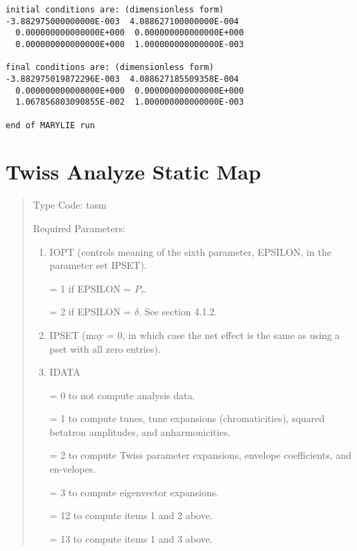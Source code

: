 \begin{footnotesize}
\begin{verbatim}
initial conditions are: (dimensionless form)
-3.882975000000000E-003  4.088627100000000E-004
  0.000000000000000E+000  0.000000000000000E+000
  0.000000000000000E+000  1.000000000000000E-003

final conditions are: (dimensionless form)
-3.882975019872296E-003  4.088627185509358E-004
  0.000000000000000E+000  0.000000000000000E+000
  1.067856803090855E-002  1.000000000000000E-003

end of MARYLIE run
\end{verbatim}
\end{footnotesize}

\newpage
\section{Twiss Analyze Static Map}
\begin{quotation}
\noindent     Type Code:  tasm 
\vspace{5mm}

\noindent Required Parameters:
\begin{enumerate}
      \item  IOPT (controls meaning of the sixth parameter, EPSILON, in
	  the parameter set IPSET).

             = 1 if EPSILON = $P_\tau$.

             = 2 if EPSILON = $\delta$.  See section 4.1.2.

	  \item  IPSET (may = 0, in which case the net effect is the same as
	  using a pset with all zero entries).

      \item  IDATA

             =   0 to not compute analysis data.

             =   1 to compute tunes, tune expansions (chromaticities),
			 squared betatron
                 \hspace*{1em}amplitudes, and anharmonicities.

             =   2 to compute Twiss parameter expansions, envelope coefficients, and en-\hspace*{1em}velopes.

             =   3 to compute eigenvector expansions.

             =  12 to compute items 1 and 2 above.

             =  13 to compute items 1 and 3 above.


\end{enumerate}
\end{quotation}
